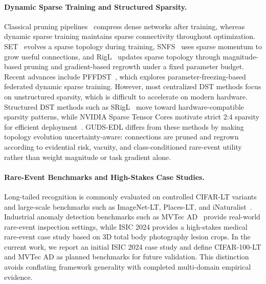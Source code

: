\documentclass[letterpaper]{article} %
\begin{document}
\paragraph{Dynamic Sparse Training and Structured Sparsity.} Classical pruning pipelines~\cite{han2016deep,frankle2019lottery} compress dense networks after training, whereas dynamic sparse training maintains sparse connectivity throughout optimization. SET~\cite{mocanu2018scalable} evolves a sparse topology during training, SNFS~\cite{dettmers2019sparse} uses sparse momentum to grow useful connections, and RigL~\cite{evci2020rigging} updates sparse topology through magnitude-based pruning and gradient-based regrowth under a fixed parameter budget. Recent advances include PFFDST~\cite{li2025pffdst}, which explores parameter-freezing-based federated dynamic sparse training. However, most centralized DST methods focus on unstructured sparsity, which is difficult to accelerate on modern hardware. Structured DST methods such as SRigL~\cite{lasby2023srigl} move toward hardware-compatible sparsity patterns, while NVIDIA Sparse Tensor Cores motivate strict 2:4 sparsity for efficient deployment~\cite{mishra2021accelerating}. GUDS-EDL differs from these methods by making topology evolution uncertainty-aware: connections are pruned and regrown according to evidential risk, vacuity, and class-conditioned rare-event utility rather than weight magnitude or task gradient alone.

\paragraph{Rare-Event Benchmarks and High-Stakes Case Studies.} Long-tailed recognition is commonly evaluated on controlled CIFAR-LT variants and large-scale benchmarks such as ImageNet-LT, Places-LT, and iNaturalist~\cite{liu2019large}. Industrial anomaly detection benchmarks such as MVTec AD~\cite{bergmann2019mvtec} provide real-world rare-event inspection settings, while ISIC 2024 provides a high-stakes medical rare-event case study based on 3D total body photography lesion crops. In the current work, we report an initial ISIC 2024 case study and define CIFAR-100-LT and MVTec AD as planned benchmarks for future validation. This distinction avoids conflating framework generality with completed multi-domain empirical evidence.

\end{document}
